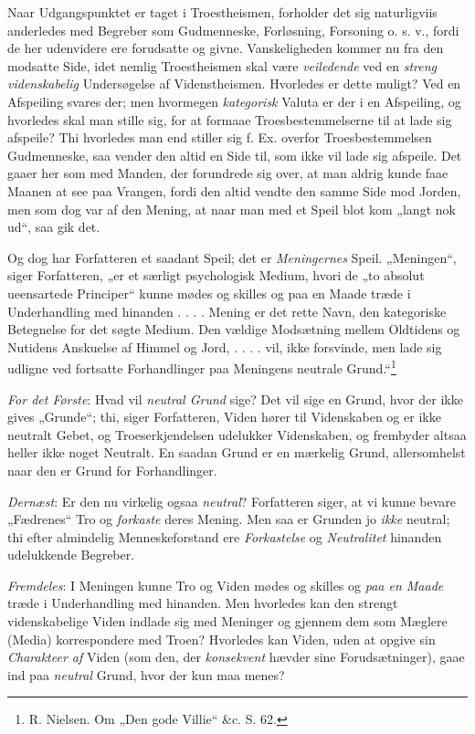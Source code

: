 \documentclass[12pt,a4paper]{book}
\newcommand{\opage}[1]{\marginnote{\footnotesize\textit{[#1]}}}
\begin{document}
Naar Udgangspunktet er taget i Troestheismen, forholder
det sig naturligviis anderledes med Begreber som
Gudmenneske, Forløsning, Forsoning o. s. v., fordi de
her udenvidere ere forudsatte og givne. Vanskeligheden
kommer nu fra den modsatte Side, idet nemlig Troestheismen
skal være \emph{veiledende} ved en \emph{streng videnskabelig}
Undersøgelse af Videnstheismen. Hvorledes
er dette muligt? Ved en Afspeiling svares der; men
hvormegen \emph{kategorisk} Valuta er der i en Afspeiling,
og hvorledes skal man stille sig, for at formaae Troesbestemmelserne
til at lade sig afspeile? Thi hvorledes
man end stiller sig f. Ex. overfor Troesbestemmelsen
Gudmenneske, saa vender den altid en Side til, som
ikke vil lade sig afspeile. Det gaaer her som med
Manden, der forundrede sig over, at man aldrig kunde
faae Maanen at see paa Vrangen, fordi den altid
vendte den samme Side mod Jorden, men som dog var
af den Mening, at naar man med et Speil blot kom
„langt nok ud“, saa gik det.

\opage{76}\setcounter{footnote}{0}Og dog har Forfatteren et saadant Speil; det er
\emph{Meningernes} Speil. „Meningen“, siger Forfatteren,
„er et særligt psychologisk Medium, hvori de „to absolut
ueensartede Principer“ kunne mødes og skilles og paa
en Maade træde i Underhandling med hinanden . . . .
Mening er det rette Navn, den kategoriske Betegnelse for
det søgte Medium. Den vældige Modsætning mellem
Oldtidens og Nutidens Anskuelse af Himmel og Jord,
. . . . vil, ikke forsvinde, men lade sig udligne ved
fortsatte Forhandlinger paa Meningens neutrale Grund.“\footnote{R. Nielsen. Om „Den gode Villie“ \&c. S. 62.}

\emph{For det Første}: Hvad vil \emph{neutral Grund}
sige? Det vil sige en Grund, hvor der ikke gives
„Grunde“; thi, siger Forfatteren, Viden hører til Videnskaben
og er ikke neutralt Gebet, og Troeserkjendelsen
udelukker Videnskaben, og frembyder altsaa heller
ikke noget Neutralt. En saadan Grund er en mærkelig
Grund, allersomhelst naar den er Grund for Forhandlinger.

\emph{Dernæst}: Er den nu virkelig ogsaa \emph{neutral}?
Forfatteren siger, at vi kunne bevare „Fædrenes“ Tro
og \emph{forkaste} deres Mening. Men saa er Grunden jo
\emph{ikke} neutral; thi efter almindelig Menneskeforstand ere
\emph{Forkastelse} og \emph{Neutralitet} hinanden udelukkende
Begreber.

\emph{Fremdeles}: I Meningen kunne Tro og Viden
mødes og skilles og \emph{paa en Maade} træde i Underhandling
med hinanden. Men hvorledes kan den strengt
videnskabelige Viden indlade sig med Meninger og gjennem
\opage{77}\setcounter{footnote}{0}dem som Mæglere (Media) korrespondere med Troen?
Hvorledes kan Viden, uden at opgive sin \emph{Charakteer
af} Viden (som den, der \emph{konsekvent} hævder sine Forudsætninger),
gaae ind paa \emph{neutral} Grund, hvor der
kun maa menes?
\end{document}
